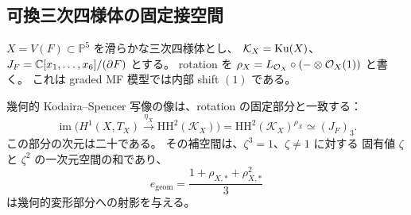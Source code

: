 \subsection{可換三次四様体の固定接空間}

$X=V(F)\subset\mathbb P^5$ を滑らかな三次四様体とし、
$\mathcal K_X=\operatorname{Ku}(X)$、$J_F=\mathbb C[x_1,\ldots,x_6]/(\partial F)$ とする。
rotation を $\rho_X=L_{\mathcal O_X}\circ(-\otimes\mathcal O_X(1))$ と書く。
これは graded MF 模型では内部 shift $(1)$ である。

\begin{proposition}
\label{ifk:prop:geometric-fixed-part}
幾何的 Kodaira--Spencer 写像の像は、rotation の固定部分と一致する：
\begin{equation}\label{ifk:eq:geometric-fixed}
 \operatorname{im}\bigl(
 H^1(X,T_X)\xrightarrow{\eta_X}\mathrm{HH}^2(\mathcal K_X)\bigr)
   =\mathrm{HH}^2(\mathcal K_X)^{\rho_X}
   \simeq (J_F)_3.
\end{equation}
この部分の次元は二十である。
その補空間は、$\zeta^3=1$、$\zeta\ne1$ に対する
固有値 $\zeta$ と $\zeta^2$ の一次元空間の和であり、
\begin{equation}\label{ifk:eq:projector}
 e_{\mathrm{geom}}
   =\frac{1+\rho_{X,*}+\rho_{X,*}^{2}}3
\end{equation}
は幾何的変形部分への射影を与える。
\end{proposition}


